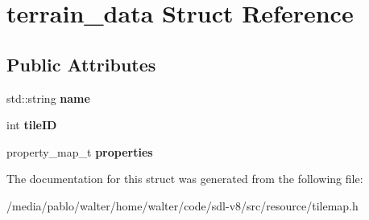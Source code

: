\hypertarget{structterrain__data}{}\section{terrain\+\_\+data Struct Reference}
\label{structterrain__data}
\subsection*{Public Attributes}
\begin{DoxyCompactItemize}
\item 
\mbox{\label{structterrain__data_ad1a941d03425e8813b9710857e920cf2}} 
std\+::string {\bfseries name}
\item 
\mbox{\label{structterrain__data_a4f2e10b28b3ceae6ed2443f4c2e2fe27}} 
int {\bfseries tile\+ID}
\item 
\mbox{\label{structterrain__data_a06e1799c4cbdfc660488c2e5dbc4feb2}} 
property\+\_\+map\+\_\+t {\bfseries properties}
\end{DoxyCompactItemize}


The documentation for this struct was generated from the following file\+:\begin{DoxyCompactItemize}
\item 
/media/pablo/walter/home/walter/code/sdl-\/v8/src/resource/tilemap.\+h\end{DoxyCompactItemize}
